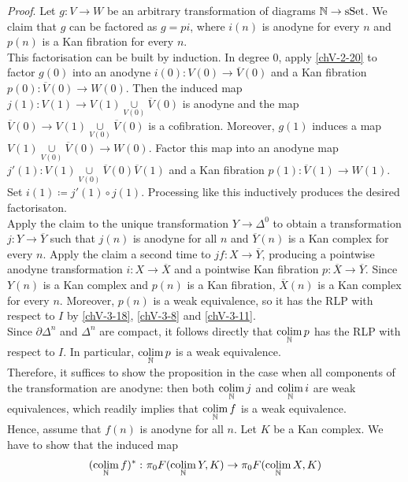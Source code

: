         \emph{Proof}. Let $g \colon V \to W$ be an arbitrary transformation of diagrams $\mathbb{N} \to \operatorname{sSet}$. We claim that $g$ can be factored as $g = p i$, where $i(n)$ is anodyne for every $n$ and $p(n)$ is a Kan fibration for every $n$.\\
        This factorisation can be built by induction. In degree $0$, apply \ref{chV-2-20} to factor $g(0)$ into an anodyne $i(0) \colon V(0) \to \overline{V}(0)$ and a Kan fibration $p(0) \colon \overline{V}(0) \to W(0)$. Then the induced map $j(1) \colon V(1) \to V(1) \underset{V(0)}{\cup} \overline{V}(0)$ is anodyne and the map $\overline{V}(0) \to V(1) \underset{V(0)}{\cup} \overline{V}(0)$ is a cofibration. Moreover, $g(1)$ induces a map $V(1) \underset{V(0)}{\cup} \overline{V}(0) \to W(0)$. Factor this map into an anodyne map $j'(1) \colon V(1) \underset{V(0)}{\cup} \overline{V}(0) \overline{V}(1)$ and a Kan fibration $p(1) \colon \overline{V}(1) \to W(1)$. Set $i(1) \coloneq j'(1) \circ j(1)$. Processing like this inductively produces the desired factorisaton.\\
        Apply the claim to the unique transformation $Y \to \Delta^0$ to obtain a transformation $j \colon Y \to \overline{Y}$ such that $j(n)$ is anodyne for all $n$ and $\overline{Y}(n)$ is a Kan complex for every $n$. Apply the claim a second time to $jf \colon X \to \overline{Y}$, producing a pointwise anodyne transformation $i \colon X \to \overline{X}$ and a pointwise Kan fibration $p \colon \overline{X} \to \overline{Y}$. Since $Y(n)$ is a Kan complex and $p(n)$ is a Kan fibration, $\overline{X}(n)$ is a Kan complex for every $n$. Moreover, $p(n)$ is a weak equivalence, so it has the RLP with respect to $I$ by \ref{chV-3-18}, \ref{chV-3-8} and \ref{chV-3-11}.\\
        Since $\partial \Delta^n$ and $\Delta^n$ are compact, it follows directly that $\operatorname*{colim}\limits_{\mathbb{N}} p$ has the RLP with respect to $I$. In particular, $\operatorname*{colim}\limits_{\mathbb{N}} p$ is a weak equivalence.\\
        Therefore, it suffices to show the proposition in the case when all components of the transformation are anodyne: then both $\operatorname*{colim}\limits_{\mathbb{N}} j$ and $\operatorname*{colim}\limits_{\mathbb{N}} i$ are weak equivalences, which readily implies that $\operatorname*{colim}\limits_{\mathbb{N}} f$ is a weak equivalence.\\
        Hence, assume that $f(n)$ is anodyne for all $n$. Let $K$ be a Kan complex. We have to show that the induced map
        \begin{equation*}
            (\operatorname*{colim}\limits_{\mathbb{N}} f)^{*} \,\colon \pi_0 F(\operatorname*{colim}\limits_{\mathbb{N}} Y, K) \to \pi_0 F(\operatorname*{colim}\limits_{\mathbb{N}} X, K)
        \end{equation*}

